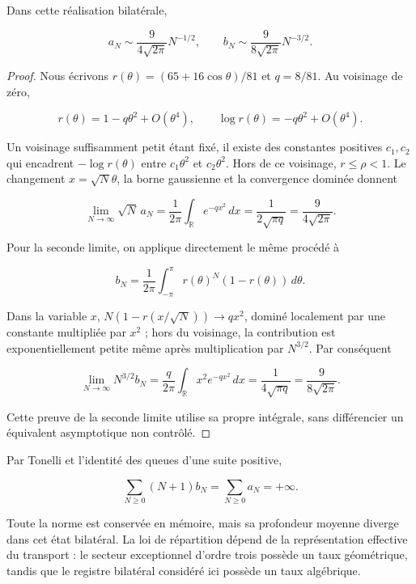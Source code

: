 \begin{theorem}
Dans cette réalisation bilatérale,

\begin{equation}
\boxed{a_N\sim\frac9{4\sqrt{2\pi}}N^{-1/2},\qquad
b_N\sim\frac9{8\sqrt{2\pi}}N^{-3/2}.}
\label{x_reciprocidad:nuc03:eq:20}
\end{equation}
\end{theorem}

\begin{proof}
Nous écrivons \(r(\theta)=(65+16\cos\theta)/81\) et \(q=8/81\). Au voisinage de zéro,

\[
r(\theta)=1-q\theta^2+O(\theta^4),\qquad
\log r(\theta)=-q\theta^2+O(\theta^4).
\]

Un voisinage suffisamment petit étant fixé, il existe des constantes positives \(c_1,c_2\) qui encadrent \(-\log r(\theta)\) entre \(c_1\theta^2\) et \(c_2\theta^2\). Hors de ce voisinage, \(r\leq\rho<1\). Le changement \(x=\sqrt N\theta\), la borne gaussienne et la convergence dominée donnent

\[
\lim_{N\to\infty}\sqrt N\,a_N
=\frac1{2\pi}\int_{\mathbb R}e^{-qx^2}\,dx
=\frac1{2\sqrt{\pi q}}=\frac9{4\sqrt{2\pi}}.
\]

Pour la seconde limite, on applique directement le même procédé à

\[
b_N=\frac1{2\pi}\int_{-\pi}^{\pi}r(\theta)^N(1-r(\theta))\,d\theta.
\]

Dans la variable \(x\), \(N(1-r(x/\sqrt N))\to qx^2\), dominé localement par une constante multipliée par \(x^2\) ; hors du voisinage, la contribution est exponentiellement petite même après multiplication par \(N^{3/2}\). Par conséquent

\[
\lim_{N\to\infty}N^{3/2}b_N
=\frac q{2\pi}\int_{\mathbb R}x^2e^{-qx^2}\,dx
=\frac1{4\sqrt{\pi q}}=\frac9{8\sqrt{2\pi}}.
\]

Cette preuve de la seconde limite utilise sa propre intégrale, sans différencier un équivalent asymptotique non contrôlé.
\end{proof}

Par Tonelli et l’identité des queues d’une suite positive,

\begin{equation}
\sum_{N\geq0}(N+1)b_N=\sum_{N\geq0}a_N=+\infty.
\label{x_reciprocidad:nuc03:eq:21}
\end{equation}

Toute la norme est conservée en mémoire, mais sa profondeur moyenne diverge dans cet état bilatéral. La loi de répartition dépend de la représentation effective du transport : le secteur exceptionnel d’ordre trois possède un taux géométrique, tandis que le registre bilatéral considéré ici possède un taux algébrique.

